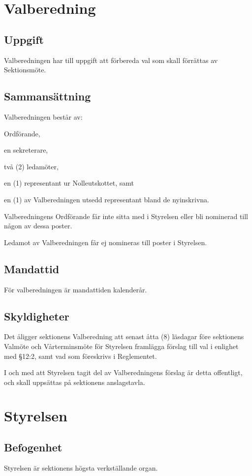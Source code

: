 \documentclass[10pt]{article}
\begin{document}
\section{Valberedning}
\subsection{Uppgift}
Valberedningen har till uppgift att förbereda val som skall förrättas av
Sektionsmöte.

\subsection{Sammansättning}
Valberedningen består av:
\begin{alphlist}
\item Ordförande,
\item en sekreterare,
\item två (2) ledamöter,
\item en (1) representant ur Nolleutskottet,  samt
\item en (1) av Valberedningen utsedd representant bland de nyinskrivna.
\end{alphlist}

Valberedningens Ordförande får inte sitta med i Styrelsen eller bli nominerad till någon av dessa poster.

Ledamot av Valberedningen får ej nomineras till poster i Styrelsen.

\subsection{Mandattid}
För valberedningen är mandattiden kalenderår.

\subsection{Skyldigheter}
Det åligger sektionens Valberedning att senast åtta (8) läsdagar före
sektionens Valmöte och Vårterminsmöte för Styrelsen framlägga förslag till
val i enlighet med §12:2, samt vad som föreskrivs i Reglementet.

I och med att Styrelsen tagit del av Valberedningens förslag är detta
offentligt, och skall uppsättas på sektionens anslagstavla.
\newpage

\section{Styrelsen}
\subsection{Befogenhet}
Styrelsen är sektionens högsta verkställande organ.
\end{document}
